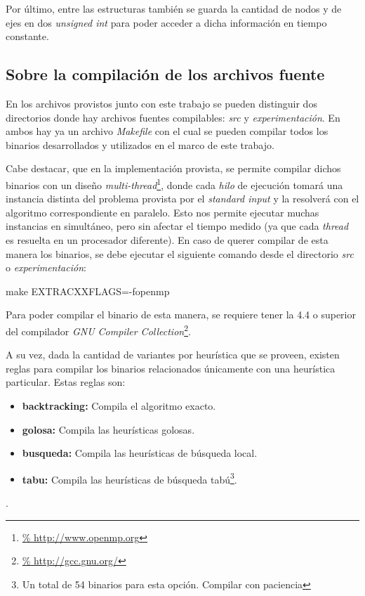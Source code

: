 \par Por \'ultimo, entre las estructuras tambi\'en se guarda la cantidad
    de nodos y de ejes en dos \emph{unsigned int} para poder acceder a dicha
    informaci\'on en tiempo constante.

{}
\subsection*{Sobre la compilaci\'on de los archivos fuente}
\par En los archivos provistos junto con este trabajo se pueden distinguir dos
    directorios donde hay archivos fuentes compilables: \emph{src} y
    \emph{experimentaci\'on}. En ambos hay ya un archivo \emph{Makefile} con el
    cual se pueden compilar todos los binarios desarrollados y utilizados en
    el marco de este trabajo.

\par Cabe destacar, que en la implementaci\'on provista, se permite compilar
    dichos binarios con un dise\~no \emph{multi-thread}\footnote{\url{%
    http://www.openmp.org}}, donde cada \emph{hilo} de ejecuci\'on tomar\'a
    una instancia distinta del problema provista por el \emph{standard input}
    y la resolver\'a con el algoritmo correspondiente en paralelo. Esto nos
    permite ejecutar muchas instancias en simult\'aneo, pero sin afectar
    el tiempo medido (ya que cada \emph{thread} es resuelta en un procesador
    diferente). En caso de querer compilar de esta manera los binarios, se
    debe ejecutar el siguiente comando desde el directorio \emph{src} o
    \emph{experimentaci\'on}:

\bigskip
\par make EXTRACXXFLAGS=-fopenmp
\bigskip

\par Para poder compilar el binario de esta manera, se requiere tener la 4.4
    o superior del compilador \emph{GNU Compiler Collection}\footnote{\url{%
    http://gcc.gnu.org/}}.

\bigskip
\par A su vez, dada la cantidad de variantes por heur\'istica que se
    proveen, existen reglas para compilar los binarios relacionados
    \'unicamente con una heur\'istica particular. Estas reglas son:

\begin{itemize}
    \item \textbf{backtracking: } Compila el algoritmo exacto.
    \item \textbf{golosa: } Compila las heur\'isticas golosas.
    \item \textbf{busqueda: } Compila las heur\'isticas de b\'usqueda local.
    \item \textbf{tabu: } Compila las heur\'isticas de b\'usqueda tab\'u\footnote{%
        Un total de 54 binarios para esta opci\'on. Compilar con paciencia}.
\end{itemize}.

